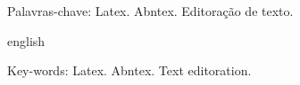 
\begin{resumo}
\noindent
\lipsum[1-1] %

    
 
 Palavras-chave: Latex. Abntex. Editoração de texto.
\end{resumo}

\begin{resumo}[Abstract]	
 	\begin{otherlanguage*}{english}
 	\noindent 
	\textit{
	\lipsum[1-1]  %
	} 
 
   
    Key-words: Latex. Abntex. Text editoration.	
 	\end{otherlanguage*}
\end{resumo}